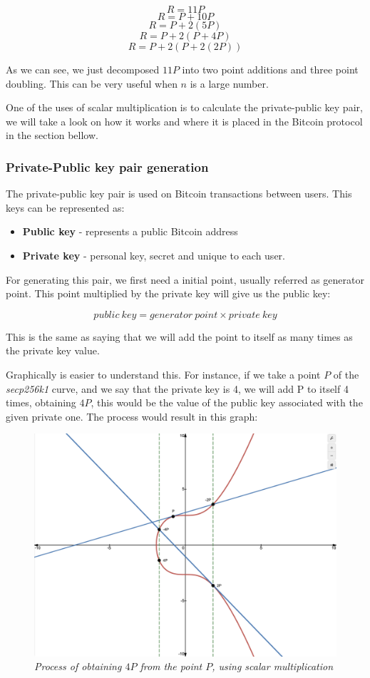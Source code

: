 \documentclass{article}
\newcommand\tab[1][1cm]{\hspace*{#1}}
\begin{document}
\[R = 11P\]
\[R = P + 10P\]
\[R = P + 2(5P)\]
\[R = P + 2(P + 4P)\]
\[R = P + 2(P + 2(2P))\]

As we can see, we just decomposed \(11P\) into two point additions and three point doubling. This can be very useful when \(n\) is a large number.

One of the uses of scalar multiplication is to calculate the private-public key pair, we will take a look on how it works and where it is placed in the Bitcoin protocol in the section bellow.

\subsubsection{Private-Public key pair generation}

\tab The private-public key pair is used on Bitcoin transactions between users. This keys can be represented as:

\begin{itemize}
    \item \textbf{Public key} - represents a public Bitcoin address
    \item \textbf{Private key} - personal key, secret and unique to each user.
\end{itemize}

For generating this pair, we first need a initial point, usually referred as generator point. This point multiplied by the private key will give us the public key:

\[public\: key = generator\: point \times private\: key\]

This is the same as saying that we will add the point to itself as many times as the private key value.

Graphically is easier to understand this. For instance, if we take a point \(P\) of the \textit{secp256k1} curve, and we say that the private key is 4, we will add P to itself 4 times, obtaining \(4P\), this would be the value of the public key associated with the given private one. The process would result in this graph:

\begin{figure}[H]
    \begin{center}
        \includegraphics[width=0.5 \textwidth]{images/Kobiltz_curve_with_points.png}
        \caption{\textit{Process of obtaining \(4P\) from the point \(P\), using scalar multiplication}}
    \end{center}
\end{figure}
\end{document}
